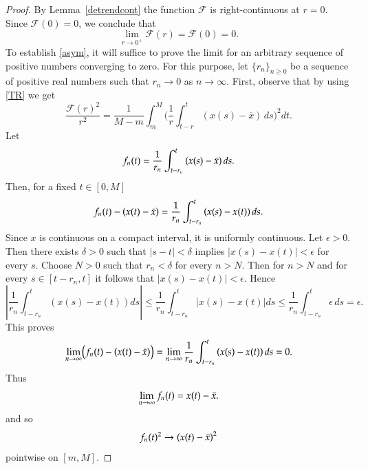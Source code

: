 \documentclass{amsart}
\begin{document}
\begin{proof}
By Lemma~\ref{detrendcont} the function $\mathcal F$ is right-continuous at $r=0$. Since $\mathcal F(0)=0$, we conclude that 
\begin{equation*}
    \lim_{r\to0^{+}}\mathcal{F}(r)=\mathcal{F}(0)=0.
\end{equation*}
To establish \eqref{asym}, it will suffice to prove the limit for an arbitrary sequence of positive numbers converging to zero. For this purpose, let $\{r_n\}_{n\geq 0}$ be a sequence of positive real numbers such that $r_n\to 0$ as $n\to\infty$. 
\newline
First, observe that by using \eqref{TR} we get
\[
\frac{\mathcal{F}(r)^2}{r^2}=\frac{1}{M-m}\int_{m}^{M}\biggl( \frac{1}{r}\int_{t-r}^{t}\left(x(s)-\overline{x}\right)\, ds\biggr)^2dt.
\]
Let 
\begin{equation*}
  f_n(t)=\frac{1}{r_n}\int_{t-r_n}^{t} \left(x(s)-\Bar{x}\right)ds.
\end{equation*}
Then, for a fixed $t\in[0,M]$
\begin{equation*}
    f_n(t)- \left( x(t)-\Bar{x}\right)=\frac{1}{r_n}\int_{t-r_n}^{t}\left(x(s)-x(t)\right)ds.
\end{equation*}
Since $x$ is continuous on a compact interval, it is uniformly continuous.
Let $\epsilon>0$. Then there exists $\delta>0$ such that $|s-t|<\delta$ implies $|x(s)-x(t)|<\epsilon$ for every $s$. Choose $N>0$ such that $r_n<\delta$ for every $n>N$. Then for $n>N$ and for every $s\in [t-r_n,t]$ it follows that $|x(s)-x(t)|<\epsilon.$ Hence
\begin{equation*}
   \left|\frac{1}{r_n}\int_{t-r_n}^{t}\left(x(s)-x(t)\right)ds\right|\leq \frac{1}{r_n}\int_{t-r_n}^{t}|x(s)-x(t)|ds\leq\frac{1}{r_n}\int_{t-r_n}^{t}\epsilon\, ds=\epsilon.
\end{equation*}
This proves 
\begin{equation*}
   \lim_{n\to \infty} \bigl(f_n(t)- \left( x(t)-\Bar{x}\right)\bigr)=\lim_{n\to\infty}\frac{1}{r_n}\int_{t-r_n}^{t}\left(x(s)-x(t)\right)ds=0.
\end{equation*}
Thus
\begin{equation*}
\lim_{n\to\infty}f_n(t)=x(t)-\Bar{x}.
\end{equation*}
and so
\begin{equation*}
f_n(t)^2\to\left(x(t)-\Bar{x}\right)^2  
\end{equation*}
pointwise on $[m,M].$


\end{proof}
\end{document}
